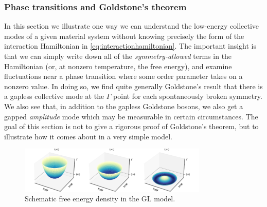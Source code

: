 \subsubsection{Phase transitions and Goldstone's theorem}\label{sec:superfluidgoldstone}

In this section we illustrate one way we can understand the low-energy collective modes of a given material system without knowing precisely the form of the interaction Hamiltonian in \cref{eq:interactionhamiltonian}.
The important insight is that we can simply write down all of the \emph{symmetry-allowed} terms in the Hamiltonian (or, at nonzero temperature, the free energy), and examine fluctuations near a phase transition where some order parameter takes on a nonzero value.
In doing so, we find quite generally Goldstone's result that there is a gapless collective mode at the $\Gamma$ point for each spontaneously broken symmetry.
We also see that, in addition to the gapless Goldstone bosons, we also get a gapped \emph{amplitude} mode which may be measurable in certain circumstances.
The goal of this section is not to give a rigorous proof of Goldstone's theorem, but to illustrate how it comes about in a very simple model.

\begin{figure}
\centering
\includegraphics[width=0.8\textwidth]{gfx/ch1/pdf/glfreeenergydensity.pdf}
\caption[Schematic free energy density in the GL model.]{
\label{fig:glfreeenergydensity}
Schematic free energy density in the GL model.
}
\end{figure}

